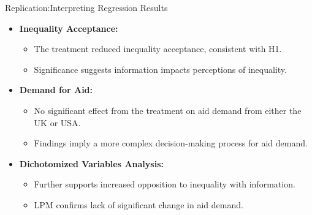 \documentclass[aspectratio=169,10pt,compress]{beamer}
\begin{document}
\begin{frame}{Replication:Interpreting Regression Results}
  \begin{itemize}
    \item \textbf{Inequality Acceptance:}
      \begin{itemize}
        \item The treatment reduced inequality acceptance, consistent with H1.
        \item Significance suggests information impacts perceptions of inequality.
      \end{itemize}
    \item \textbf{Demand for Aid:}
      \begin{itemize}
        \item No significant effect from the treatment on aid demand from either the UK or USA.
        \item Findings imply a more complex decision-making process for aid demand.
      \end{itemize}
    \item \textbf{Dichotomized Variables Analysis:}
      \begin{itemize}
        \item Further supports increased opposition to inequality with information.
        \item LPM confirms lack of significant change in aid demand.
      \end{itemize}
    
  \end{itemize}
\end{frame}
\end{document}
